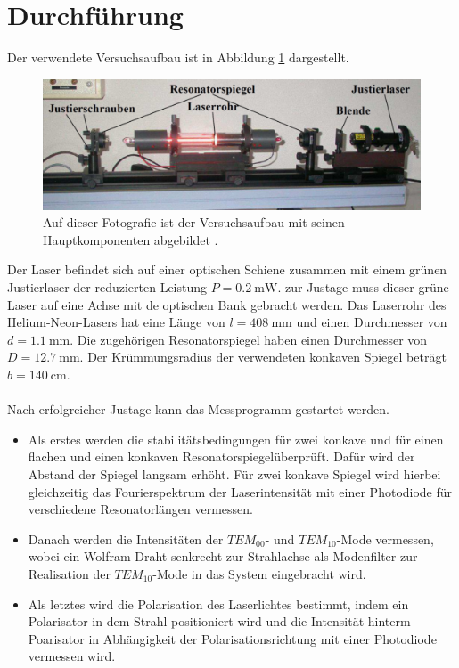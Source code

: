 \section{Durchführung}
\label{sec:Durchführung}

Der verwendete Versuchsaufbau ist in Abbildung \ref{abb4} dargestellt.
\begin{figure}
    \centering
    \includegraphics[width=\textwidth]{figure/Aufbau.pdf}
    \caption{Auf dieser Fotografie ist der Versuchsaufbau mit seinen 
    Hauptkomponenten abgebildet \cite{sample}.}
    \label{abb4}
\end{figure}
Der Laser befindet sich auf einer optischen Schiene zusammen mit einem grünen
Justierlaser der reduzierten Leistung $P = \SI{0,2}{\milli\watt}$.
zur Justage muss dieser grüne Laser auf eine Achse mit de optischen Bank 
gebracht werden. 
Das Laserrohr des Helium-Neon-Lasers hat eine Länge von $l = \SI{408}{\milli\meter}$
und einen Durchmesser von $d = \SI{1,1}{\milli\meter}$. Die zugehörigen 
Resonatorspiegel haben einen Durchmesser von $D = \SI{12,7}{\milli\meter}$.
Der Krümmungsradius der verwendeten konkaven Spiegel beträgt $b = \SI{140}{\centi\meter}$.
\\\\
Nach erfolgreicher Justage kann das Messprogramm gestartet werden. 
\begin{itemize}
    \item Als erstes werden die stabilitätsbedingungen für zwei konkave und für einen 
    flachen und einen konkaven Resonatorspiegelüberprüft. Dafür wird der Abstand der 
    Spiegel langsam erhöht. Für zwei konkave Spiegel wird hierbei gleichzeitig 
    das Fourierspektrum der Laserintensität mit einer Photodiode 
    für verschiedene Resonatorlängen vermessen.
    \item Danach werden die Intensitäten der $TEM_{\text{00}}$- und $TEM_{\text{10}}$-Mode
    vermessen, wobei ein Wolfram-Draht senkrecht zur Strahlachse als Modenfilter zur 
    Realisation der $TEM_{\text{10}}$-Mode in das System eingebracht wird.
    \item Als letztes wird die Polarisation des Laserlichtes bestimmt, indem ein 
    Polarisator in dem Strahl positioniert wird und die Intensität hinterm 
    Poarisator in Abhängigkeit der Polarisationsrichtung mit einer Photodiode vermessen 
    wird. 
\end{itemize}
\newpage